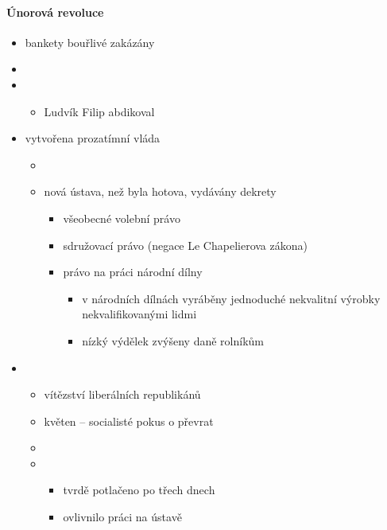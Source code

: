 \paragraph{Únorová revoluce}
\begin{itemize}
\item bankety bouřlivé \ra zakázány
\item {}
\item {}
	\begin{itemize}
	\item[\ra]Ludvík Filip abdikoval
	\end{itemize}
\item vytvořena prozatímní vláda
	\begin{itemize}
	\item {}
	\item nová ústava, než byla hotova, vydávány dekrety
		\begin{itemize}
		\item všeobecné volební právo
		\item sdružovací právo (negace Le Chapelierova zákona)
		\item právo na práci \ra národní dílny 
			\begin{itemize}
			\item v národních dílnách vyráběny jednoduché nekvalitní výrobky nekvalifikovanými lidmi
			\item nízký výdělek \ra zvýšeny daně rolníkům
			\end{itemize}
		\end{itemize}
	\end{itemize}
\item {}
	\begin{itemize}
	\item vítězství liberálních republikánů
	\item květen -- socialisté pokus o převrat
	\item {}
	\item {}
		\begin{itemize}
		\item tvrdě potlačeno po třech dnech
		\item ovlivnilo práci na ústavě \ra 
		\end{itemize}
	\end{itemize}
\end{itemize}

